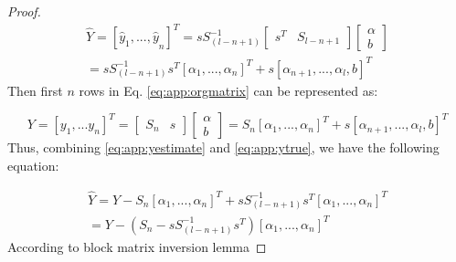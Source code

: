 \begin{proof}
	\begin{equation}\label{eq:app:yestimate}
	\begin{array}{l}
	\hat{Y}={\left[ {\hat {{y}}_1,...,\hat {{y}}}_n \right]^T} = sS_{(l - n + 1)}^{ - 1}\left[ {\begin{array}{*{20}{c}}
		{{s^T}}&{{S_{l - n + 1}}}
		\end{array}} \right]\left[ {\begin{array}{*{20}{c}}
		\alpha \\
		b
		\end{array}} \right]\\
	= sS_{(l - n + 1)}^{ - 1}{s^T}{\left[ {{\alpha _1},...,{\alpha _n}} \right]^T} + s{\left[ {{\alpha _{n + 1}},...,{\alpha _l},b} \right]^T}
	\end{array}
	\end{equation}
	Then first $n$ rows in Eq. \eqref{eq:app:orgmatrix} can be represented as:
	
	\begin{equation}\label{eq:app:ytrue}
	Y={\left[ {{y_1},...{y_n}} \right]^T} = \left[ {\begin{array}{*{20}{c}}
		{{S_n}}&s
		\end{array}} \right]\left[ {\begin{array}{*{20}{c}}
		\alpha \\
		b
		\end{array}} \right] = {S_n}{\left[ {{\alpha _1},...,{\alpha _n}} \right]^T} + s{\left[ {{\alpha _{n + 1}},...,{\alpha _l},b} \right]^T}
	\end{equation}
	Thus, combining \eqref{eq:app:yestimate} and \eqref{eq:app:ytrue}, we have the following equation:
	
	\begin{equation}
	\begin{array}{l}
	\hat Y = Y - {S_n}{\left[ {{\alpha _1},...,{\alpha _n}} \right]^T} + sS_{(l - n + 1)}^{ - 1}{s^T}{\left[ {{\alpha _1},...,{\alpha _n}} \right]^T}\\
	= Y - \left( {{S_n} - sS_{(l - n + 1)}^{ - 1}{s^T}} \right){\left[ {{\alpha _1},...,{\alpha _n}} \right]^T}
	\end{array}
	\end{equation}
	According to block matrix inversion lemma
	

\end{proof}
